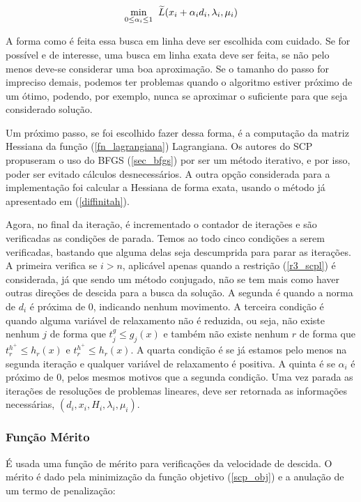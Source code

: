 \begin{equation}
  \underset{0\leq \alpha_i \leq 1}{\mathrm{min}}\hspace{0.2cm}  \widetilde{L}(x_i + \alpha_i d_i, \lambda_i, \mu_i)
\end{equation}

A forma como é feita essa busca em linha deve ser escolhida com cuidado. Se
for possível e de interesse, uma busca em linha exata deve ser feita, se não
pelo menos deve-se considerar uma boa aproximação. Se o tamanho do passo for
impreciso demais, podemos ter problemas quando o algoritmo estiver próximo
de um ótimo, podendo, por exemplo, nunca se aproximar o suficiente para
que seja considerado solução.

Um próximo passo, se foi escolhido fazer dessa forma, é a computação
da matriz Hessiana da função (\ref{fn_lagrangiana}) Lagrangiana. Os autores do
SCP propuseram o uso do BFGS (\ref{sec_bfgs}) por ser um método iterativo, e
por isso, poder ser evitado cálculos desnecessários. A outra opção considerada
para a implementação foi calcular a Hessiana de forma exata, usando o método
já apresentado em (\ref{diffinitah}).




Agora, no final da iteração, é incrementado o contador de iterações e são verificadas
as condições de parada. Temos ao todo cinco condições a serem verificadas, bastando
que alguma delas seja descumprida para parar as iterações. A primeira verifica se
\(i > n\), aplicável apenas quando a restrição (\ref{r3_scpl}) é considerada, já
que sendo um método conjugado, não se tem mais como haver outras direções de descida
para a busca da solução. A segunda é quando a norma de \(d_i\) é próxima de 0, indicando
nenhum movimento. A terceira condição é quando alguma variável de relaxamento não é
reduzida, ou seja, não existe nenhum \(j\) de forma que \(t^g_j \leq g_j(x)\) e
também não existe nenhum \(r\) de forma que
\(t^{h^+}_r \leq h_r(x)\) e  \(t^{h^+}_r \leq h_r(x)\). A quarta condição é se já estamos
pelo menos na segunda iteração e qualquer variável de relaxamento é positiva. A quinta
é se \(\alpha_i\) é próximo de 0, pelos mesmos motivos que a segunda condição. Uma vez
parada as iterações de resoluções de problemas lineares, deve ser retornada as informações
necessárias, \((d_i, x_i, H_i, \lambda_i, \mu_i)\).

\subsubsection{Função Mérito}
É usada uma função de mérito para verificações da velocidade de descida. O mérito é dado pela
minimização da função objetivo (\ref{scp_obj}) e a anulação de um termo de penalização:

